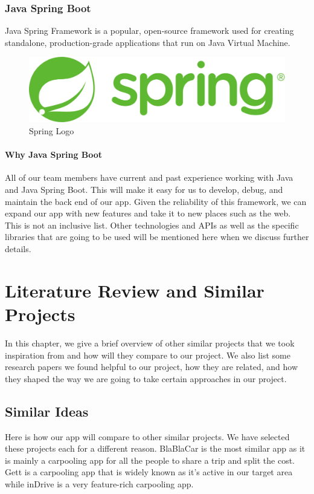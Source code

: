 \documentclass[a4paper, 12pt]{article} %
\begin{document}
            \subsubsection{Java Spring Boot}
                Java Spring Framework is a popular, open-source framework used for creating standalone, production-grade applications that run on Java Virtual Machine. \cite{spring_wiki}
                \begin{figure}[h]
                    \centering
                    \includegraphics[width=1\textwidth]{Spring Boot Logo.png}
                    \caption{Spring Logo \cite{spring_logo}}
                    \label{fig:Spring Logo}
                \end{figure}
                \paragraph{Why Java Spring Boot} All of our team members have current and past experience working with Java and Java Spring Boot. This will make it easy for us to develop, debug, and maintain the back end of our app. Given the reliability of this framework, we can expand our app with new features and take it to new places such as the web.
        This is not an inclusive list. Other technologies and APIs as well as the specific libraries that are going to be used will be mentioned here when we discuss further details.

    \pagebreak
    
    \section{Literature Review and Similar Projects}
        In this chapter, we give a brief overview of other similar projects that we took inspiration from and how will they compare to our project. We also list some research papers we found helpful to our project, how they are related, and how they shaped the way we are going to take certain approaches in our project.
        \subsection{Similar Ideas}
            Here is how our app will compare to other similar projects. We have selected these projects each for a different reason. BlaBlaCar is the most similar app as it is mainly a carpooling app for all the people to share a trip and split the cost. Gett is a carpooling app that is widely known as it's active in our target area while inDrive is a very feature-rich carpooling app.
\end{document}
